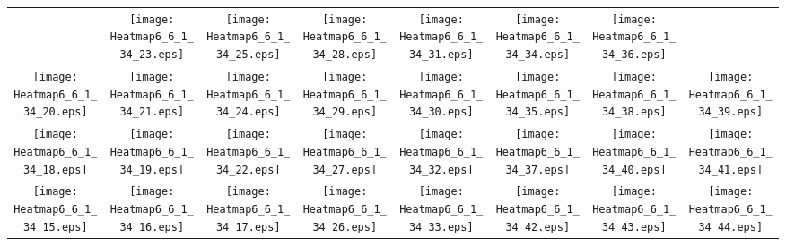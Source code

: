 \documentclass{standalone}
\begin{document}
\renewcommand{\arraystretch}{0}
\setlength{\tabcolsep}{0pt}
\begin{tabular}{ *8{c} }
 & \texttt{[image: Heatmap6\_6\_1\_34\_23.eps]} & \texttt{[image: Heatmap6\_6\_1\_34\_25.eps]} & \texttt{[image: Heatmap6\_6\_1\_34\_28.eps]} & \texttt{[image: Heatmap6\_6\_1\_34\_31.eps]} & \texttt{[image: Heatmap6\_6\_1\_34\_34.eps]} & \texttt{[image: Heatmap6\_6\_1\_34\_36.eps]} &  \\
\texttt{[image: Heatmap6\_6\_1\_34\_20.eps]} & \texttt{[image: Heatmap6\_6\_1\_34\_21.eps]} & \texttt{[image: Heatmap6\_6\_1\_34\_24.eps]} & \texttt{[image: Heatmap6\_6\_1\_34\_29.eps]} & \texttt{[image: Heatmap6\_6\_1\_34\_30.eps]} & \texttt{[image: Heatmap6\_6\_1\_34\_35.eps]} & \texttt{[image: Heatmap6\_6\_1\_34\_38.eps]} & \texttt{[image: Heatmap6\_6\_1\_34\_39.eps]} \\
\texttt{[image: Heatmap6\_6\_1\_34\_18.eps]} & \texttt{[image: Heatmap6\_6\_1\_34\_19.eps]} & \texttt{[image: Heatmap6\_6\_1\_34\_22.eps]} & \texttt{[image: Heatmap6\_6\_1\_34\_27.eps]} & \texttt{[image: Heatmap6\_6\_1\_34\_32.eps]} & \texttt{[image: Heatmap6\_6\_1\_34\_37.eps]} & \texttt{[image: Heatmap6\_6\_1\_34\_40.eps]} & \texttt{[image: Heatmap6\_6\_1\_34\_41.eps]} \\
\texttt{[image: Heatmap6\_6\_1\_34\_15.eps]} & \texttt{[image: Heatmap6\_6\_1\_34\_16.eps]} & \texttt{[image: Heatmap6\_6\_1\_34\_17.eps]} & \texttt{[image: Heatmap6\_6\_1\_34\_26.eps]} & \texttt{[image: Heatmap6\_6\_1\_34\_33.eps]} & \texttt{[image: Heatmap6\_6\_1\_34\_42.eps]} & \texttt{[image: Heatmap6\_6\_1\_34\_43.eps]} & \texttt{[image: Heatmap6\_6\_1\_34\_44.eps]} \\

\end{tabular}
\end{document}
